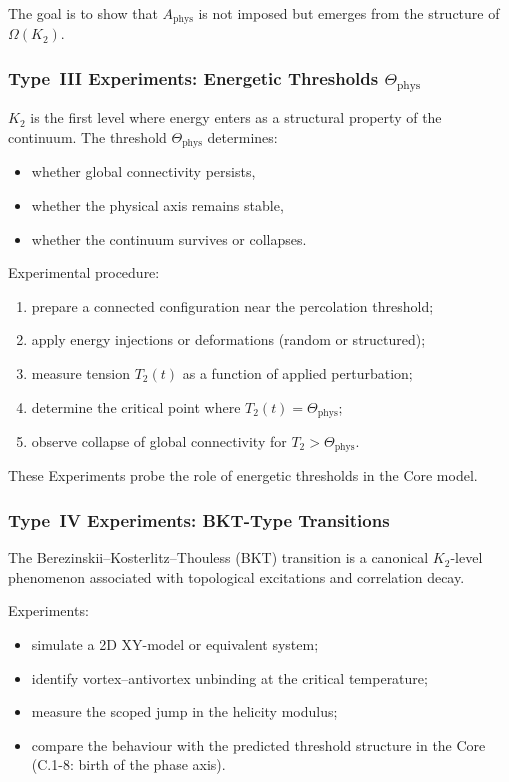 The goal is to show that $A_{\mathrm{phys}}$ is not imposed but emerges
from the structure of $\Omega(K_2)$.



\subsubsection{Type~III Experiments: Energetic Thresholds $\Theta_{\mathrm{phys}}$}

$K_2$ is the first level where energy enters as a structural property of the
continuum.
The threshold $\Theta_{\mathrm{phys}}$ determines:

\begin{itemize}
    \item whether global connectivity persists,
    \item whether the physical axis remains stable,
    \item whether the continuum survives or collapses.
\end{itemize}

Experimental procedure:

\begin{enumerate}
    \item prepare a connected configuration near the percolation threshold;
    \item apply energy injections or deformations (random or structured);
    \item measure tension $T_2(t)$ as a function of applied perturbation;
    \item determine the critical point where $T_2(t) = \Theta_{\mathrm{phys}}$;
    \item observe collapse of global connectivity for $T_2 > \Theta_{\mathrm{phys}}$.
\end{enumerate}

These Experiments probe the role of energetic thresholds in the Core model.



\subsubsection{Type~IV Experiments: BKT-Type Transitions}

The Berezinskii–Kosterlitz–Thouless (BKT) transition is a canonical
$K_2$-level phenomenon associated with topological excitations and
correlation decay.

Experiments:

\begin{itemize}
    \item simulate a 2D XY-model or equivalent system;
    \item identify vortex–antivortex unbinding at the critical temperature;
    \item measure the scoped jump in the helicity modulus;
    \item compare the behaviour with the predicted threshold structure in
          the Core (C.1-8: birth of the phase axis).
\end{itemize}

